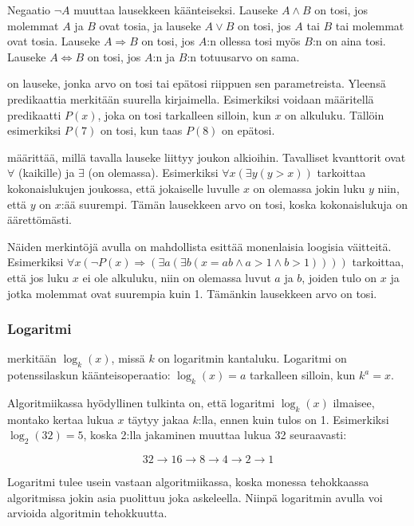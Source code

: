 Negaatio $\lnot A$ muuttaa lausekkeen käänteiseksi.
Lauseke $A \land B$ on tosi, jos molemmat $A$ ja $B$ ovat tosia,
ja lauseke $A \lor B$ on tosi, jos $A$ tai $B$ tai molemmat
ovat tosia.
Lauseke $A \Rightarrow B$ on tosi,
jos $A$:n ollessa tosi myös $B$:n on aina tosi.
Lauseke $A \Leftrightarrow B$ on tosi,
jos $A$:n ja $B$:n totuusarvo on sama.


 on lauseke, jonka arvo on tosi tai epätosi
riippuen sen parametreista.
Yleensä predikaattia merkitään suurella kirjaimella.
Esimerkiksi voidaan määritellä predikaatti $P(x)$,
joka on tosi tarkalleen silloin, kun $x$ on alkuluku.
Tällöin esimerkiksi $P(7)$ on tosi, kun taas $P(8)$ on epätosi.


 määrittää, millä tavalla
lauseke liittyy joukon alkioihin.
Tavalliset kvanttorit
ovat $\forall$ (kaikille) ja $\exists$ (on olemassa).
Esimerkiksi $\forall x (\exists y (y > x))$
tarkoittaa kokonaislukujen joukossa,
että jokaiselle luvulle $x$ on olemassa
jokin luku $y$ niin, että $y$ on $x$:ää suurempi.
Tämän lausekkeen arvo on tosi, koska kokonaislukuja
on äärettömästi.

Näiden merkintöjä avulla on mahdollista esittää
monenlaisia loogisia väitteitä.
Esimerkiksi
$\forall x (\lnot P(x) \Rightarrow (\exists a (\exists b (x = ab \land a > 1 \land b > 1))))$
tarkoittaa, että jos luku $x$ ei ole alkuluku,
niin on olemassa luvut $a$ ja $b$,
joiden tulo on $x$ ja jotka molemmat ovat suurempia kuin 1.
Tämänkin lausekkeen arvo on tosi.

\subsubsection{Logaritmi}


 merkitään $\log_k(x)$, missä $k$ on logaritmin kantaluku.
Logaritmi on potenssilaskun käänteisoperaatio:
$\log_k(x)=a$ tarkalleen silloin, kun $k^a=x$.

Algoritmiikassa hyödyllinen tulkinta on,
että logaritmi $\log_k(x)$ ilmaisee, montako kertaa lukua $x$
täytyy jakaa $k$:lla, ennen kuin tulos on 1.
Esimerkiksi $\log_2(32)=5$, koska 2:lla jakaminen
muuttaa lukua 32 seuraavasti:

\[32 \rightarrow 16 \rightarrow 8 \rightarrow 4 \rightarrow 2 \rightarrow 1 \]

Logaritmi tulee usein vastaan algoritmiikassa,
koska monessa tehokkaassa algoritmissa jokin asia puolittuu
joka askeleella.
Niinpä logaritmin avulla voi arvioida algoritmin tehokkuutta.

